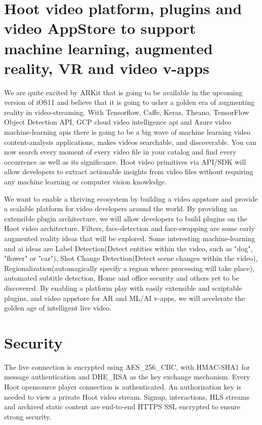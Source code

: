 \documentclass{article}
\begin{document}
\section{Hoot video platform, plugins and video AppStore to support machine learning,
  augmented reality, VR and video v-apps}
We are quite excited by ARKit that is going to be available in the
upcoming version of iOS11 and believe that it is going to usher a
golden era of augmenting reality in video-streaming. With Tensorflow,
Caffe, Keras, Theano, TensorFlow Object Detection API, GCP cloud
video intelligence api and Azure video machine-learning apis there is going to be a
big wave of machine learning video content-analysis applications,
makes videos searchable, and discoverable. You can now search every
moment of every video file in your catalog and find every occurrence
as well as its significance. Hoot video primitives via API/SDK will allow developers to extract
actionable insights from video files without requiring any machine
learning or computer vision knowledge. 

 We want to enable a
thriving ecosystem by building a video appstore and provide a scalable
platform for video developers around the world. By providing an
extensible plugin architecture, we will allow developers to build
plugins on the Hoot video architecture. Filters, face-detection and face-swapping
are some early augmented reality ideas that will be explored. Some interesting
machine-learning and ai ideas are Label Detection(Detect entities
within the video, such as "dog", "flower" or "car"), Shot Change
Detection(Detect scene changes within the video),
Regionalization(automagically specify a region where processing will
take place), automated subtitle detection, Home and office security and others yet to be discovered. By enabling a platform
play with easily extensible and scriptable plugins, and video appstore
for AR and ML/AI v-apps, we will accelerate the golden age of
intelligent live video.

\section{Security}
The live connection is encrypted using AES\_256\_CBC, with HMAC-SHA1 for message authentication and DHE\_RSA as the key exchange mechanism. Every Hoot opensource player connection is authenticated.
An authorization key is needed to view a private Hoot video stream. Signup, interactions, HLS streams and archived static content are end-to-end HTTPS  SSL encrypted to ensure strong security.    
\end{document}
